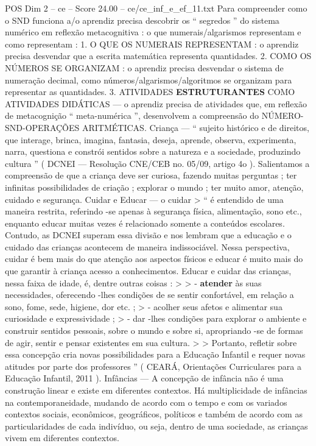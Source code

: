 \begin{textsample}{POS Dim 2 – ce – Score 24.00 – ce/ce\_inf\_e\_ef\_11.txt}
Para compreender como o SND funciona a/o aprendiz precisa descobrir os “ segredos ” do sistema numérico em reflexão metacognitiva : o que numerais/algarismos representam e como representam : 1.
O QUE OS NUMERAIS REPRESENTAM : o aprendiz precisa desvendar que a escrita matemática representa quantidades. 2.
COMO OS NÚMEROS SE ORGANIZAM : o aprendiz precisa desvendar o sistema de numeração decimal, como números/algarismos/algoritmos se organizam para representar as quantidades. 3.
ATIVIDADES \textbf{ESTRUTURANTES} COMO ATIVIDADES DIDÁTICAS — o aprendiz precisa de atividades que, em reflexão de metacognição “ meta-numérica ”, desenvolvem a compreensão do NÚMERO-SND-OPERAÇÕES ARITMÉTICAS.
Criança — “ sujeito histórico e de direitos, que interage, brinca, imagina, fantasia, deseja, aprende, observa, experimenta, narra, questiona e constrói sentidos sobre a natureza e a sociedade, produzindo cultura ” ( DCNEI — Resolução CNE/CEB no. 05/09, artigo 4o ).
Salientamos a compreensão de que a criança deve ser curiosa, fazendo muitas perguntas ; ter infinitas possibilidades de criação ; explorar o mundo ; ter muito amor, atenção, cuidado e segurança.
Cuidar e Educar — o cuidar > “ é entendido de uma maneira restrita, referindo -se apenas à segurança física, alimentação, sono etc., enquanto educar muitas vezes é relacionado somente a conteúdos escolares.
Contudo, as DCNEI superam essa divisão e nos lembram que a educação e o cuidado das crianças acontecem de maneira indissociável.
Nessa perspectiva, cuidar é bem mais do que atenção aos aspectos físicos e educar é muito mais do que garantir à criança acesso a conhecimentos.
Educar e cuidar das crianças, nessa faixa de idade, é, dentre outras coisas : > > - \textbf{atender} às suas necessidades, oferecendo -lhes condições de se sentir confortável, em relação a sono, fome, sede, higiene, dor etc. ; > - acolher seus afetos e alimentar sua curiosidade e expressividade ; > - dar -lhes condições para explorar o ambiente e construir sentidos pessoais, sobre o mundo e sobre si, apropriando -se de formas de agir, sentir e pensar existentes em sua cultura. > > Portanto, refletir sobre essa concepção cria novas possibilidades para a Educação Infantil e requer novas atitudes por parte dos professores ” ( CEARÁ, Orientações Curriculares para a Educação Infantil, 2011 ).
Infâncias — A concepção de infância não é uma construção linear e existe em diferentes contextos.
Há multiplicidade de infâncias na contemporaneidade, mudando de acordo com o tempo e com os variados contextos sociais, econômicos, geográficos, políticos e também de acordo com as particularidades de cada indivíduo, ou seja, dentro de uma sociedade, as crianças vivem em diferentes contextos.

\end{textsample}

